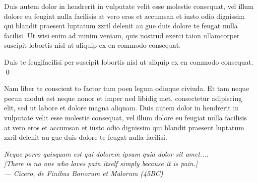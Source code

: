 \documentclass[11pt]{report}
\begin{document}
Duis autem dolor in hendrerit in vulputate velit esse molestie
consequat, vel illum dolore eu feugiat nulla facilisis at vero eros et
accumsan et iusto odio dignissim qui blandit praesent luptatum zzril
delenit au gue duis dolore te feugat nulla facilisi.  Ut wisi enim ad
minim veniam, quis nostrud exerci taion ullamcorper suscipit lobortis
nisl ut aliquip ex en commodo consequat. 

\begin{corollary}
Duis te feugifacilisi per suscipit lobortis nisl ut aliquip ex en
commodo consequat. \qed
\end{corollary}

Nam liber te conscient to factor tum poen legum odioque civiuda.  Et
tam neque pecun modut est neque nonor et imper ned libidig met,
consectetur adipiscing elit, sed ut labore et dolore magna aliquam.
Duis autem dolor in hendrerit in vulputate velit esse molestie
consequat, vel illum dolore eu feugiat nulla facilisis at vero eros et
accumsan et iusto odio dignissim qui blandit praesent luptatum zzril
delenit au gue duis dolore te feugat nulla facilisi.

\vfill
\begin{flushright}\small\sffamily\slshape
Neque porro quisquam est qui dolorem ipsum quia dolor sit amet....\\{}
[There is no one who loves pain itself simply because it is pain.]\\
\textup{--- Cicero, \textsl{de Finibus Bonorum et Malorum} (45BC)}
\end{flushright}
\end{document}
